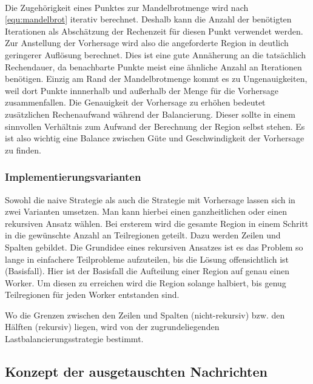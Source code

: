\paragraph*{}\label{par:load_balancing_prediction}
Die Zugehörigkeit eines Punktes zur Mandelbrotmenge wird nach \autoref{equ:mandelbrot} iterativ berechnet.
Deshalb kann die Anzahl der benötigten Iterationen als Abschätzung der Rechenzeit für diesen Punkt verwendet werden.
Zur Anstellung der Vorhersage wird also die angeforderte Region in deutlich geringerer Auflösung berechnet.
Dies ist eine gute Annäherung an die tatsächlich Rechendauer, da benachbarte Punkte meist eine ähnliche Anzahl an Iterationen benötigen.
Einzig am Rand der Mandelbrotmenge kommt es zu Ungenauigkeiten, weil dort Punkte innnerhalb und außerhalb der Menge für die Vorhersage zusammenfallen.
Die Genauigkeit der Vorhersage zu erhöhen bedeutet zusätzlichen Rechenaufwand während der Balancierung.
Dieser sollte in einem sinnvollen Verhältnis zum Aufwand der Berechnung der Region selbst stehen.
Es ist also wichtig eine Balance zwischen Güte und Geschwindigkeit der Vorhersage zu finden.

\subsubsection{Implementierungsvarianten}

Sowohl die naive Strategie als auch die Strategie mit Vorhersage lassen sich in zwei Varianten umsetzen.
Man kann hierbei einen ganzheitlichen oder einen rekursiven Ansatz wählen.
Bei ersterem wird die gesamte Region in einem Schritt in die gewünschte Anzahl an Teilregionen geteilt.
Dazu werden Zeilen und Spalten gebildet.
Die Grundidee eines rekursiven Ansatzes ist es das Problem so lange in einfachere Teilprobleme aufzuteilen, bis die Lösung offensichtlich ist (Basisfall).
Hier ist der Basisfall die Aufteilung einer Region auf genau einen Worker.
Um diesen zu erreichen wird die Region solange halbiert, bis genug Teilregionen für jeden Worker entstanden sind.

Wo die Grenzen zwischen den Zeilen und Spalten (nicht-rekursiv) bzw. den Hälften (rekursiv) liegen, wird von der zugrundeliegenden Lastbalancierungsstrategie bestimmt.

\subsection{Konzept der ausgetauschten Nachrichten}

